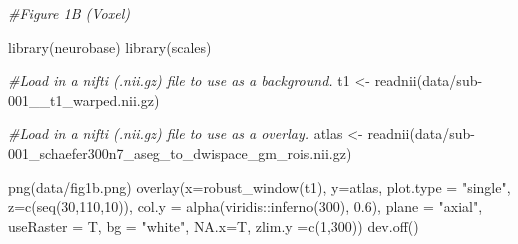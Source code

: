 \documentclass{article}
\newenvironment{Shaded}{\begin{snugshade}}{\end{snugshade}}
\newcommand{\AttributeTok}[1]{\textcolor[rgb]{0.77,0.63,0.00}{#1}}
\newcommand{\CommentTok}[1]{\textcolor[rgb]{0.56,0.35,0.01}{\textit{#1}}}
\newcommand{\DecValTok}[1]{\textcolor[rgb]{0.00,0.00,0.81}{#1}}
\newcommand{\FloatTok}[1]{\textcolor[rgb]{0.00,0.00,0.81}{#1}}
\newcommand{\FunctionTok}[1]{\textcolor[rgb]{0.00,0.00,0.00}{#1}}
\newcommand{\NormalTok}[1]{#1}
\newcommand{\OtherTok}[1]{\textcolor[rgb]{0.56,0.35,0.01}{#1}}
\newcommand{\SpecialCharTok}[1]{\textcolor[rgb]{0.00,0.00,0.00}{#1}}
\newcommand{\StringTok}[1]{\textcolor[rgb]{0.31,0.60,0.02}{#1}}
\begin{document}
\begin{Shaded}
\begin{Highlighting}[]
\CommentTok{\#Figure 1B (Voxel)}

\FunctionTok{library}\NormalTok{(neurobase)}
\FunctionTok{library}\NormalTok{(scales)}

\CommentTok{\#Load in a nifti (.nii.gz) file to use as a background. }
\NormalTok{t1 }\OtherTok{\textless{}{-}} \FunctionTok{readnii}\NormalTok{(}\StringTok{\textquotesingle{}data/sub{-}001\_\_t1\_warped.nii.gz\textquotesingle{}}\NormalTok{) }

\CommentTok{\#Load in a nifti (.nii.gz) file to use as a overlay. }
\NormalTok{atlas }\OtherTok{\textless{}{-}}  \FunctionTok{readnii}\NormalTok{(}\StringTok{\textquotesingle{}data/sub{-}001\_schaefer300n7\_aseg\_to\_dwispace\_gm\_rois.nii.gz\textquotesingle{}}\NormalTok{)}

\FunctionTok{png}\NormalTok{(}\StringTok{\textquotesingle{}data/fig1b.png\textquotesingle{}}\NormalTok{)}
\FunctionTok{overlay}\NormalTok{(}\AttributeTok{x=}\FunctionTok{robust\_window}\NormalTok{(t1), }\AttributeTok{y=}\NormalTok{atlas, }
        \AttributeTok{plot.type =} \StringTok{"single"}\NormalTok{, }
        \AttributeTok{z=}\FunctionTok{c}\NormalTok{(}\FunctionTok{seq}\NormalTok{(}\DecValTok{30}\NormalTok{,}\DecValTok{110}\NormalTok{,}\DecValTok{10}\NormalTok{)), }
        \AttributeTok{col.y =}  \FunctionTok{alpha}\NormalTok{(viridis}\SpecialCharTok{::}\FunctionTok{inferno}\NormalTok{(}\DecValTok{300}\NormalTok{), }\FloatTok{0.6}\NormalTok{),}
        \AttributeTok{plane =} \StringTok{"axial"}\NormalTok{,  }
        \AttributeTok{useRaster =}\NormalTok{ T, }
        \AttributeTok{bg =} \StringTok{"white"}\NormalTok{,}
        \AttributeTok{NA.x=}\NormalTok{T, }
        \AttributeTok{zlim.y =}\FunctionTok{c}\NormalTok{(}\DecValTok{1}\NormalTok{,}\DecValTok{300}\NormalTok{))}
\FunctionTok{dev.off}\NormalTok{()}
\end{Highlighting}
\end{Shaded}
\end{document}
